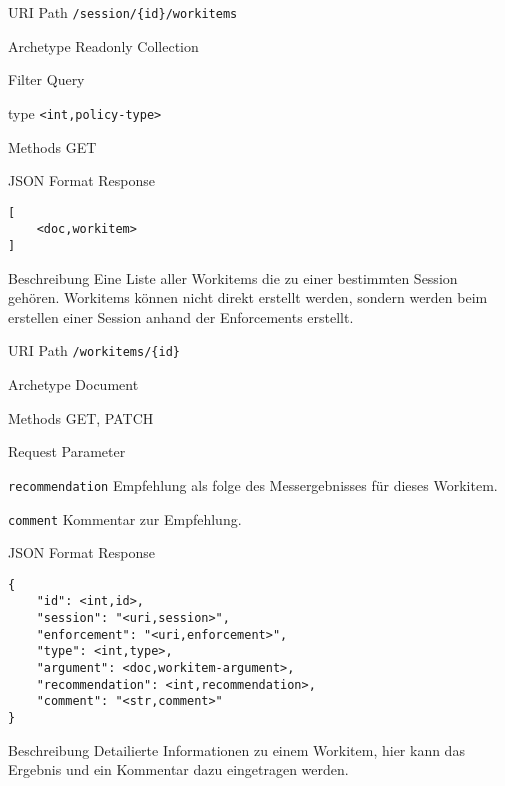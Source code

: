 \documentclass[10pt,a4paper]{scrartcl}
\begin{document}
\begin{mdframed}[style=def]
\begin{description*}
	\item[URI Path] \texttt{/session/\{id\}/workitems}
	\item[Archetype] Readonly Collection
	\item[Filter Query] \hfill
	\begin{description*}
	    \item[type] \texttt{<int,policy-type>}
	\end{description*}
	\item[Methods] GET
	\item[JSON Format Response] \hfill
\begin{lstlisting}
[
	<doc,workitem>
]
\end{lstlisting}
    \item[Beschreibung] Eine Liste aller Workitems die zu einer bestimmten Session gehören. Workitems können nicht direkt erstellt werden, sondern werden beim erstellen einer Session anhand der Enforcements erstellt.
\end{description*}
\end{mdframed}


\begin{mdframed}[style=def]
\begin{description*}
	\item[URI Path] \texttt{/workitems/\{id\}}
	\item[Archetype] Document
	\item[Methods] GET, PATCH
	\item[Request Parameter] \hfill
    \begin{description*}
        \item[\texttt{recommendation}] Empfehlung als folge des Messergebnisses für dieses Workitem.
        \item[\texttt{comment}] Kommentar zur Empfehlung.
    \end{description*}
	\item[JSON Format Response] \hfill
\begin{lstlisting}
{
	"id": <int,id>,
	"session": "<uri,session>",
	"enforcement": "<uri,enforcement>",
	"type": <int,type>,
	"argument": <doc,workitem-argument>,
	"recommendation": <int,recommendation>,
	"comment": "<str,comment>"
}
\end{lstlisting}
    \item[Beschreibung] Detailierte Informationen zu einem Workitem, hier kann das Ergebnis und ein Kommentar dazu eingetragen werden.
\end{description*}
\end{mdframed}
\end{document}
